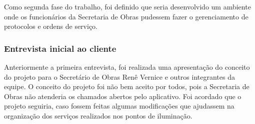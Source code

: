 \documentclass[
	article,			%
	11pt,				%
	oneside,			%
	a4paper,			%
	english,			%
	brazil,				%
	sumario=tradicional
	]{abntex2}
\begin{document}
Como segunda fase do trabalho, foi definido que seria desenvolvido um ambiente
onde os funcionários da Secretaria de Obras pudessem fazer o gerenciamento de
protocolos e ordens de serviço.

\subsubsection{Entrevista inicial ao cliente}

Anteriormente a primeira entrevista, foi realizada uma apresentação do conceito
do projeto para o Secretário de Obras Renê Vernice e outros integrantes da
equipe. O conceito do projeto foi não bem aceito por todos, pois a Secretaria
de Obras não atenderia os chamados abertos pelo aplicativo. Foi acordado que o
projeto seguiria, caso fossem feitas algumas modificações que ajudassem na
organização dos serviços realizados nos pontos de iluminação.
\end{document}
